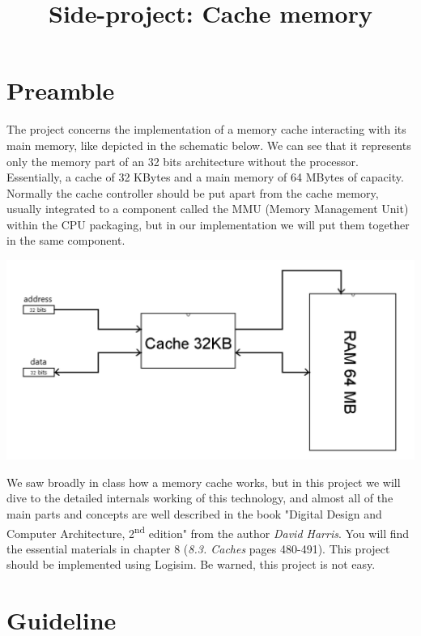 \documentclass[a4paper, french, 12pt]{article}
\title{\centering \textbf{Side-project: Cache memory}}
\author{}
\date{}
\begin{document}
\maketitle
\thispagestyle{fancy}

\section{Preamble}

The project concerns the implementation of a memory cache interacting with its main memory, like depicted in the schematic below. We can see that it represents only the memory part of an 32 bits architecture without the processor. Essentially, a cache of 32 KBytes and a main memory of 64 MBytes of capacity. Normally the cache controller should be put apart from the cache memory, usually integrated to a component called the MMU (Memory Management Unit) within the CPU packaging, but in our implementation we will put them together in the same component.

\includegraphics[width=\textwidth]{img.png}

We saw broadly in class how a memory cache works, but in this project we will dive to the detailed internals working of this technology, and almost all of the main parts and concepts are well described in the book "Digital Design and Computer Architecture, 2\textsuperscript{nd} edition" from the author \textit{David Harris}. You will find the essential materials in chapter 8 (\textit{8.3. Caches} pages 480-491). This project should be implemented using Logisim. Be warned, this project is not easy.

\newpage

\section{Guideline}
\end{document}
